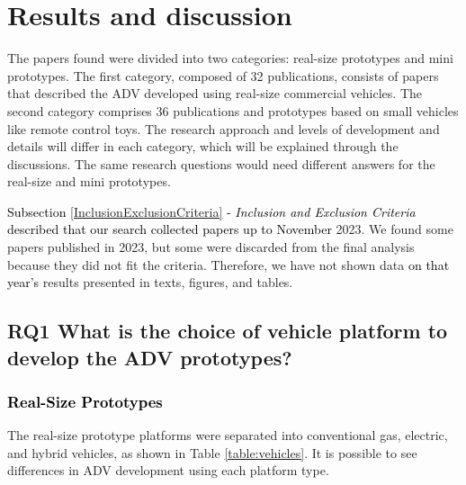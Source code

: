 \documentclass[lettersize,journal]{IEEEtran}
\begin{document}
\section{Results and discussion}\label{resultadosediscussao}

The papers found were divided into two categories: real-size prototypes and mini prototypes. The first category, composed of 32 publications, consists of papers that described the ADV developed using real-size commercial vehicles. The second category comprises 36 publications and prototypes based on small vehicles like remote control toys. The research approach and levels of development and details will differ in each category, which will be explained through the discussions. The same research questions would need different answers for the real-size and mini prototypes.

\textcolor{black}{Subsection \ref{InclusionExclusionCriteria} - \textit{Inclusion and Exclusion Criteria} described that our search collected papers up to November} 2023. We found some papers published in 2023, but some were discarded from the final analysis because they did not fit the criteria. Therefore, we have not shown data \textcolor{black}{on that year's} results presented in texts, figures, and tables.


\subsection {\textbf{RQ1  What  is  the  choice  of  vehicle  platform  to  develop  the ADV prototypes?}}

\vspace{1em}

\subsubsection {\textcolor{black}{\textbf{Real-Size Prototypes}}}

\leavevmode\vspace{0.1\baselineskip}%

The real-size prototype platforms were separated into conventional gas, electric, and hybrid vehicles, as shown in Table \ref{table:vehicles}. It is possible to see differences in ADV development using each platform type.
\end{document}
